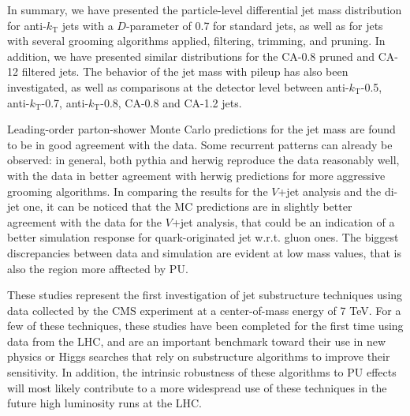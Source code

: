 \label{sec:summary}

In summary, we have presented the particle-level differential jet mass distribution for 
anti-$k_{\mathrm{T}}$ jets with a $D$-parameter of 0.7 for standard jets, as well as
for jets with several grooming algorithms applied,
filtering, trimming, and pruning. In addition, we have presented similar distributions for the CA-0.8 pruned and CA-12 filtered jets. The behavior of the jet mass with pileup has also been
investigated, as well as comparisons at the detector level
between anti-$k_{\mathrm{T}}$-0.5, anti-$k_{\mathrm{T}}$-0.7,
anti-$k_{\mathrm{T}}$-0.8, CA-0.8 and CA-1.2 jets.  

Leading-order parton-shower Monte Carlo predictions for the jet mass are found to be in good agreement with the data. Some recurrent patterns can already be observed: in general, both pythia and herwig reproduce the data reasonably well, with the data in better agreement with herwig predictions for more aggressive grooming algorithms. In comparing the results for the $V$+jet analysis and the di-jet one, it can be noticed that the MC predictions are in slightly better agreement with the data for the $V$+jet analysis, that could be an indication of a better simulation response for quark-originated jet w.r.t. gluon ones. The biggest discrepancies between data and simulation are evident at low mass values, that is also the region more afftected by PU.    

These studies represent the first investigation of jet substructure techniques using data collected by the CMS experiment at a center-of-mass energy of 7 TeV. For a few of these techniques, these studies have been completed for the first time using data from the LHC, and are an important benchmark toward their use in new physics or Higgs searches that rely on substructure algorithms to improve their sensitivity. In addition, the intrinsic robustness of these algorithms to PU effects will most likely contribute to a more widespread use of these techniques in the future high luminosity runs at the LHC.


